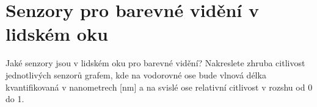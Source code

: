 \section{Senzory pro barevné vidění v lidském oku}
Jaké senzory jsou v lidském oku pro barevné vidění? Nakreslete zhruba citlivost jednotlivých senzorů grafem, 
kde na vodorovné ose bude vlnová délka kvantifikovaná v nanometrech [nm] a na svislé ose relativní citlivost v rozshu od 
0 do 1.


